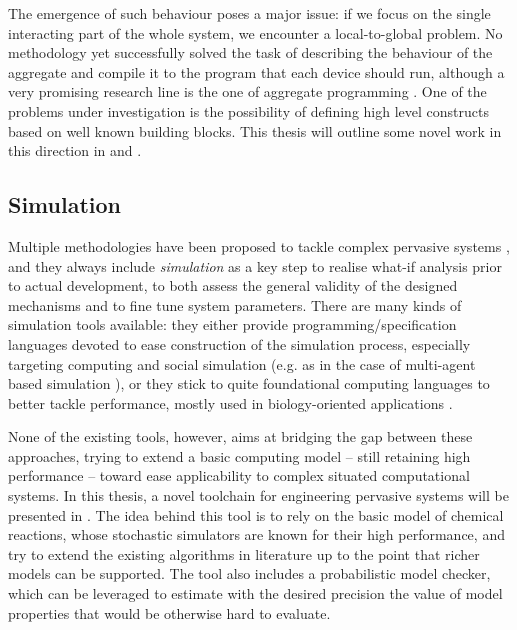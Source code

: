 \documentclass[12pt,a4paper,twoside,openright]{book}
\begin{document}
The emergence of such behaviour poses a major issue: if we focus on the single interacting part of the whole system, we encounter a local-to-global problem.
%
No methodology yet successfully solved the task of describing the behaviour of the aggregate and compile it to the program that each device should run, although a very promising research line is the one of aggregate programming \cite{proto,VDB-FOCLASA-CIC2013}.
%
One of the problems under investigation is the possibility of defining high level constructs based on well known building blocks.
%
This thesis will outline some novel work in this direction in  and .


\subsection{Simulation}

Multiple methodologies have been proposed to tackle complex pervasive systems \cite{MCOV-SCP2011,BabulakIJOE2008,BandiniJASSS2009,josMacalN10,sapere-procedia7}, and they always include \emph{simulation} as a key step  to realise what-if analysis prior to actual development, to both assess the general validity of the designed mechanisms and to fine tune system parameters.
%
There are many kinds of simulation tools available: they either provide programming/specification languages devoted to ease construction of the simulation process, especially targeting computing and social simulation (e.g. as in the case of multi-agent based simulation \cite{luke2005simulation,BandiniJASSS2009,SchumacherCEEMAS2007,vizzari-massimulationbook09,repast,sklar2007al}), or they stick to quite foundational computing languages to better tackle performance, mostly used in biology-oriented applications \cite{Priami1995,murata1989,UhrmacherWSC2005,EwaldJOS2007}.

None of the existing tools, however, aims at bridging the gap between these approaches, trying to extend a basic computing model -- still retaining high performance -- toward ease applicability to complex situated computational systems.
%
In this thesis, a novel toolchain for engineering pervasive systems will be presented in .
%
The idea behind this tool is to rely on the basic model of chemical reactions, whose stochastic simulators are known for their high performance, and try to extend the existing algorithms in literature up to the point that richer models can be supported.
%
The tool also includes a probabilistic model checker, which can be leveraged to estimate with the desired precision the value of model properties that would be otherwise hard to evaluate.
\end{document}

